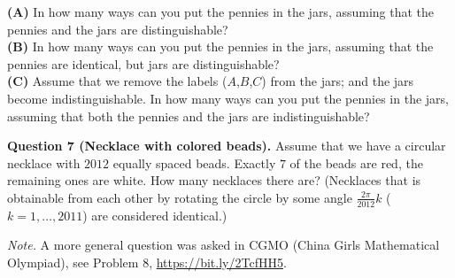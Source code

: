 \documentclass[jou]{apa6}
\begin{document}
{\bf (A)} In how many ways can you put the pennies in the jars, assuming that the pennies and the jars are distinguishable?\\
{\bf (B)} In how many ways can you put the pennies in the jars, assuming that the pennies are identical, but jars are distinguishable?\\
{\bf (C)} Assume that we remove the labels ($A$,$B$,$C$) from the jars; and the jars become indistinguishable. 
In how many ways can you put the pennies in the jars, assuming that both the pennies and the jars are indistinguishable?

\vspace{6pt}
{\bf Question 7 (Necklace with colored beads).} Assume that we have a circular necklace with 
$2012$ equally spaced beads. Exactly $7$ of the beads are red, the remaining ones are white. 
How many necklaces there are? (Necklaces that is obtainable from each other by rotating the
circle by some angle $\frac{2\pi}{2012}k$ ($k = 1,\ldots,2011$) are considered identical.)

{\em Note.} A more general question was asked in CGMO (China Girls Mathematical Olympiad), 
see Problem 8, \url{https://bit.ly/2TcfHH5}. 
\end{document}
